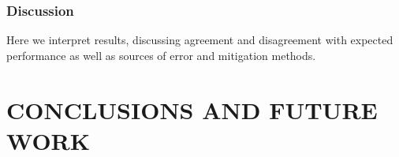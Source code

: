 \subsection{Discussion}
Here we interpret results, discussing agreement and disagreement with expected performance as well as sources of error and mitigation methods.

%
%
%
%
%
%
%
%
%
%
%

\chapter{CONCLUSIONS AND FUTURE WORK}




